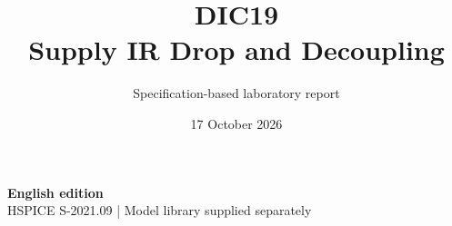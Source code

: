 \documentclass[11pt,a4paper]{article}
\title{\color{accent}DIC19\\[4pt]Supply IR Drop and Decoupling}
\author{Specification-based laboratory report}
\date{17 October 2026}
\begin{document}
\maketitle
\begin{center}\small\textbf{English edition}\\
HSPICE S-2021.09 \quad | \quad Model library supplied separately
\end{center}


\end{document}
